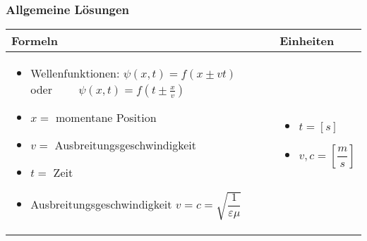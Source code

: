 \newpage

\subsubsection{Allgemeine Lösungen}
\begin{tabular}{ | m{15cm} | m{3cm}  | }
	\hline
	Formeln & Einheiten  \\ \hline
	\hline
	\begin{itemize}
	\item[] Wellenfunktionen: $\psi(x,t)=f(x\pm vt)\qquad$ oder $\qquad \psi(x,t)=f(t\pm \frac{x}{v})$
	\item[] $x=$ momentane Position
	\item[] $v=$ Ausbreitungsgeschwindigkeit
	\item[] $t=$ Zeit
	\item[] Ausbreitungsgeschwindigkeit $v=c=\sqrt{\dfrac{1}{\varepsilon\mu}}$
		
	\end{itemize}   
	&
	\begin{itemize}
		\item[] $t=[s]$
		\item[] $v,c=[\dfrac{m}{s}]$

	\end{itemize} 	
	\\ \hline
\end{tabular}

